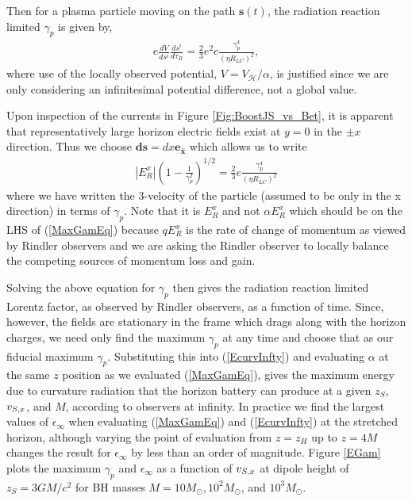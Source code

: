Then for a plasma particle moving on the path $\mathbf{s}(t)$, the radiation reaction limited $\gamma_p$ is given by,
\begin{align}
e \frac{d V}{ds^i} \frac{ds^i}{d \tau_R} =  \frac{2}{3} e^2 c \frac{\gamma^4_p}{(\eta R_{LC})^2},
\end{align}
where use of the  locally observed potential, $V=V_{\mathcal H}/\alpha$, is justified since we are only 
considering an infinitesimal potential difference, not a global value.



Upon inspection of the currents in Figure \ref{Fig:BoostJS_vs_Bet}, it is apparent that representatively large horizon electric fields exist at $y=0$ in the $ \pm x$ direction. Thus we choose $\mathbf{ds} = dx \mathbf{e_{\hat{x}}}$ which allows us to write
\begin{align}
| E^x_R  |   \left( 1 - \frac{1}{\gamma^2_p} \right)^{1/2}  =  \frac{2}{3} e  \frac{\gamma^4_p}{(\eta R_{LC})^2} 
 \label{MaxGamEq}
\end{align}
where we have written the 3-velocity of the particle (assumed to be only in the x direction) in terms of $\gamma_p$. Note that it is $E^x_R$ and not $\alpha E^x_R$ which should be on the LHS of (\ref{MaxGamEq}) because $qE^x_R$ is the rate of change of momentum as viewed by Rindler observers and we are asking the Rindler observer to locally balance the competing sources of momentum loss and gain.  

Solving the above equation for $\gamma_p$ then gives the radiation reaction limited Lorentz factor, as observed by Rindler observers, as a function of time. Since, however, the fields are stationary in the frame which drags along with the horizon charges, we need only find the maximum $\gamma_p$ at any time and choose that as our fiducial maximum $\gamma_p$. Substituting this into (\ref{EcurvInfty}) and evaluating $\alpha$ at the same $z$ position as we evaluated (\ref{MaxGamEq}), gives the maximum energy due to curvature radiation that the horizon battery can produce at a given $z_S$, $v_{S, x}$, and $M$, according to observers at infinity. In practice we find the largest values of $\epsilon_{\infty}$ when evaluating (\ref{MaxGamEq}) and (\ref{EcurvInfty}) at the stretched horizon, although varying the point of evaluation from $z=z_H$ up to $z=4M$ changes the result for $\epsilon_{\infty}$ by less than an order of magnitude. Figure \ref{EGam} plots the maximum $\gamma_p$ and $\epsilon_{\infty}$ as a function of $v_{S, x}$ at dipole height of $z_S = 3GM/c^2$ for BH masses $M=10 M_{\odot}, 10^2 M_{\odot}$, and $10^3 M_{\odot}$. 

